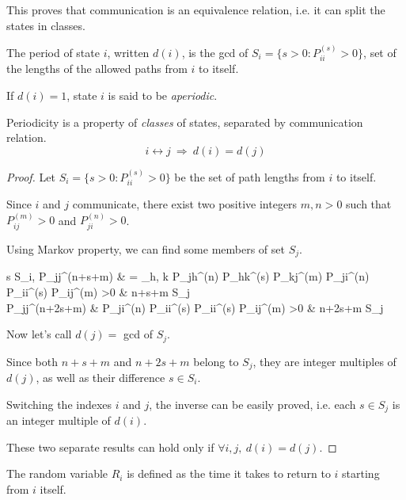 	This proves that communication is an equivalence relation, i.e. it can split the states in classes.

	\begin{definition}[Periodicity]
		The period of state $i$, written $d(i)$, is the \gls{gcd} of $S_i = \{ s>0 : P_{ii}^{(s)} > 0 \}$, set of the lengths of the allowed paths from $i$ to itself.

		If $d(i) = 1$, state $i$ is said to be \emph{aperiodic}.
	\end{definition}

	\begin{theorem}[Periodicity]
		Periodicity is a property of \emph{classes} of states, separated by communication relation.
			$$ i \leftrightarrow j ~ \Rightarrow ~ d(i) = d(j) $$
	\end{theorem}

	\begin{proof}
		Let $S_i = \{ s>0 : P_{ii}^{(s)} >0 \}$ be the set of path lengths from $i$ to itself.

		Since $i$ and $j$ communicate, there exist two positive integers $m, n > 0$ such that $P_{ij}^{(m)} > 0$ and $P_{ji}^{(n)} > 0$.

		Using Markov property, we can find some members of set $S_j$.

		\begin{esp*}
			\forall s \in S_i, P_{jj}^{(n+s+m)}
				& = \sum_{h, k} P_{jh}^{(n)} P_{hk}^{(s)} P_{kj}^{(m)} \geq P_{ji}^{(n)} P_{ii}^{(s)} P_{ij}^{(m)} >0
					& \implies n+s+m \in S_j \\
				P_{jj}^{(n+2s+m)} & \geq P_{ji}^{(n)} P_{ii}^{(s)} P_{ii}^{(s)} P_{ij}^{(m)} >0
					& \implies n+2s+m \in S_j
		\end{esp*}

		Now let's call $d(j) =$ \gls{gcd} of $S_j$.

		Since both $n+s+m$ and $n+2s+m$ belong to $S_j$, they are integer multiples of $d(j)$, as well as their difference $s \in S_i$.

		Switching the indexes $i$ and $j$, the inverse can be easily proved, i.e. each $s \in S_j$ is an integer multiple of $d(i)$.

		\bigbreak
		These two separate results can hold only if $\forall i,j, ~d(i) = d(j)$.
	\end{proof}

	\begin{definition}
		The random variable $R_i$ is defined as the time it takes to return to $i$ starting from $i$ itself.
	\end{definition}

